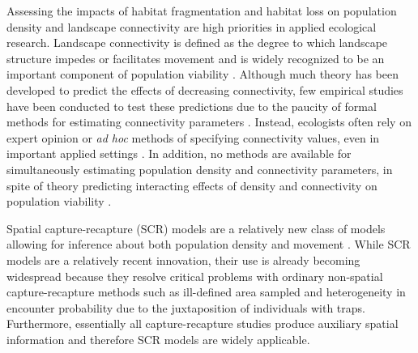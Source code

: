 \documentclass[12pt]{article}
\begin{document}
\begin{spacing}{1.8}
Assessing the impacts of habitat fragmentation and habitat loss on
population density and landscape connectivity
are high priorities in applied ecological research.
Landscape connectivity is defined as the
degree to which landscape structure impedes or facilitates movement
\citep{tischendorf_fahrig:2000} and is widely recognized to be an
important component of population viability
\citep{with_crist:1995}. Although much theory has
been developed to predict the effects of decreasing
connectivity, few empirical studies have been conducted to test these
predictions due to the paucity of formal methods for estimating connectivity
parameters \citep{cushman_etal:2010}. Instead, ecologists often rely on expert opinion or
\textit{ad hoc} methods of specifying connectivity values, even in
important applied settings
\citep{adriaensen_etal:2003,beier_etal:2008,zeller_etal:2012}. In addition, no
methods are available for simultaneously estimating population density and
connectivity parameters, in spite of theory
predicting interacting effects of density and connectivity on
population viability \citep{tischendorf_etal:2005,cushman_etal:2010}.

Spatial capture-recapture (SCR) models are a relatively new class of
models allowing for inference about both population density and
movement %
\citep{efford:2004,borchers_efford:2008, royle_young:2008, efford_etal:2009ecol,
  royle_etal:2009ecol}. While SCR models are a relatively recent innovation,
their use is already becoming widespread \citep{efford_etal:2009ecol,
  gardner_etal:2010jwm, gardner_etal:2010ecol,kery_etal:2010,
  gopalaswamy_etal:2012, foster_harmsen:2012} because they resolve
critical problems with ordinary non-spatial capture-recapture
methods such as ill-defined area sampled and heterogeneity in
encounter probability due to the juxtaposition of individuals with
traps. Furthermore,
essentially all capture-recapture studies produce auxiliary spatial
information and therefore SCR models are widely applicable.



\end{spacing}
\end{document}
